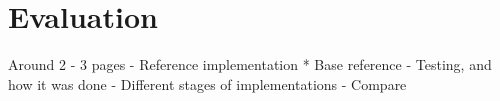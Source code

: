 \section{Evaluation}
	Around 2 - 3 pages
    - Reference implementation
     * Base reference
    - Testing, and how it was done
    - Different stages of implementations
    - Compare